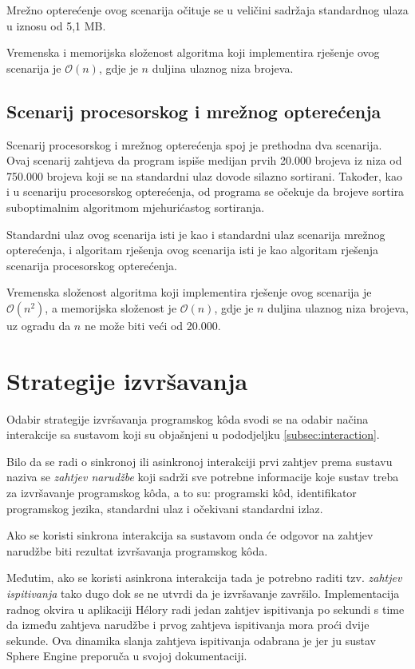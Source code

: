 \documentclass[times, utf8, diplomski]{fer}
\begin{document}
Mrežno opterećenje ovog scenarija očituje se u veličini sadržaja standardnog ulaza u iznosu od 5,1 MB.

Vremenska i memorijska složenost algoritma koji implementira rješenje ovog scenarija je $\mathcal{O}(n)$, gdje je $n$ duljina ulaznog niza brojeva.

\subsection{Scenarij procesorskog i mrežnog opterećenja}
Scenarij procesorskog i mrežnog opterećenja spoj je prethodna dva scenarija. Ovaj scenarij zahtjeva da program ispiše medijan prvih 20.000 brojeva iz niza od 750.000 brojeva koji se na standardni ulaz dovode silazno sortirani. Također, kao i u scenariju procesorskog opterećenja, od programa se očekuje da brojeve sortira suboptimalnim algoritmom mjehurićastog sortiranja.

Standardni ulaz ovog scenarija isti je kao i standardni ulaz scenarija mrežnog opterećenja, i algoritam rješenja ovog scenarija isti je kao algoritam rješenja scenarija procesorskog opterećenja.

Vremenska složenost algoritma koji implementira rješenje ovog scenarija je $\mathcal{O}(n^2)$, a memorijska složenost je $\mathcal{O}(n)$, gdje je $n$ duljina ulaznog niza brojeva, uz ogradu da $n$ ne može biti veći od 20.000.

\section{Strategije izvršavanja}
Odabir strategije izvršavanja programskog kôda svodi se na odabir načina interakcije sa sustavom koji su objašnjeni u pododjeljku \ref{subsec:interaction}.

Bilo da se radi o sinkronoj ili asinkronoj interakciji prvi zahtjev prema sustavu naziva se \textit{zahtjev narudžbe}  koji sadrži sve potrebne informacije koje sustav treba za izvršavanje programskog kôda, a to su: programski kôd, identifikator programskog jezika, standardni ulaz i očekivani standardni izlaz.

Ako se koristi sinkrona interakcija sa sustavom onda će odgovor na zahtjev narudžbe biti rezultat izvršavanja programskog kôda. 

Međutim, ako se koristi asinkrona interakcija tada je potrebno raditi tzv. \textit{zahtjev ispitivanja}  tako dugo dok se ne utvrdi da je izvršavanje završilo. Implementacija radnog okvira u aplikaciji Hélory radi jedan zahtjev ispitivanja po sekundi s time da između zahtjeva narudžbe i prvog zahtjeva ispitivanja mora proći dvije sekunde. Ova dinamika slanja zahtjeva ispitivanja odabrana je jer ju sustav Sphere Engine preporuča u svojoj dokumentaciji.
\end{document}

